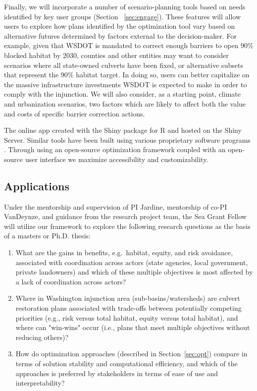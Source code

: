 \documentclass[12pt]{elsarticle}
\begin{document}
Finally, we will incorporate a number of scenario-planning tools based on needs identified by key user groups (Section ~\ref{sec:engage}). These features will allow users to explore how plans identified by the optimization tool vary based on alternative futures determined by factors external to the decision-maker. For example, given that WSDOT is mandated to correct enough barriers to open 90\% blocked habitat by 2030, counties and other entities may want to consider scenarios where all state-owned culverts have been fixed, or alternative subsets that represent the 90\% habitat target. In doing so, users can better capitalize on the massive infrastructure investments WSDOT is expected to make in order to comply with the injunction. We will also consider, as a starting point, climate and urbanization scenarios, two factors which are likely to affect both the value and costs of specific barrier correction actions.
  
The online app created with the Shiny package for R and hosted on the Shiny Server. Similar tools have been built using various proprietary software programs \citep{ohanley_optipass_2015, moody_pet_2017, mcmanamay_commonalities_2019}. Through using an open-source optimization framework coupled with an open-source user interface we maximize accessibility and customizability. 


\subsection*{Applications}

Under the mentorship and supervision of PI Jardine, mentorship of co-PI VanDeynze, and guidance from the research project team, the Sea Grant Fellow will utilize our framework to explore the following research questions as the basis of a masters or Ph.D. thesis: 

\begin{enumerate}
\item What are the gains in benefits, e.g.\ habitat, equity, and risk avoidance, associated with coordination across actors (state agencies, local government, private landowners) and which of these multiple objectives is most affected by a lack of coordination across actors? 
\item Where in Washington injunction area (sub-basins/watersheds) are culvert restoration plans associated with trade-offs between potentially competing priorities (e.g., risk versus total habitat, equity versus total habitat), and where can "win-wins" occur (i.e., plans that meet multiple objectives without reducing others)? 
\item How do optimization approaches (described in Section~\ref{sec:opt}) compare in terms of solution stability and computational efficiency, and which of the approaches is preferred by stakeholders in terms of ease of use and interpretability?
\end{enumerate}
\end{document}
